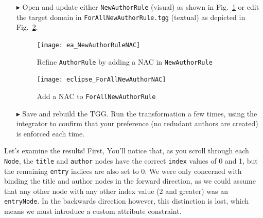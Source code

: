 \begin{itemize}

\item[$\blacktriangleright$] Open and update either \texttt{NewAuthorRule} (visual) as shown in Fig.~\ref{ea:existingAuthorNAC} or edit the target domain in 
\texttt{ForAllNewAuthorRule.tgg} (textual) as depicted in Fig.~\ref{eclipse:existingAuthorNAC}.


\begin{figure}[htbp]
\begin{center}
  \texttt{[image: ea\_NewAuthorRuleNAC]}
  \caption{Refine \texttt{AuthorRule} by adding a NAC in \texttt{NewAuthorRule} \update}
  \label{ea:existingAuthorNAC}
\end{center}
\end{figure}

\begin{figure}[htbp]
\begin{center}
  \texttt{[image: eclipse\_ForAllNewAuthorNAC]}
  \caption{Add a NAC to \texttt{ForAllNewAuthorRule}}
  \label{eclipse:existingAuthorNAC}
\end{center}
\end{figure}

\item[$\blacktriangleright$] Save and rebuild the TGG. Run the transformation a few times, using the integrator to confirm that your preference (no redudant
authors are created) is enforced each time. 

\end{itemize}

Let's examine the results! First, You'll notice that, as you scroll through each \texttt{Node}, the \texttt{title} and \texttt{author} nodes have the correct
\texttt{index} values of 0 and 1, but the remaining \texttt{entry} indices are also set to 0. We were only concerned with binding the title and author nodes in
the forward direction, as we could assume that any other node with any other index value (2 and greater) was an \texttt{entryNode}. In the backwards direction
however, this distinction is lost, which means we must introduce a custom attribute constraint.
